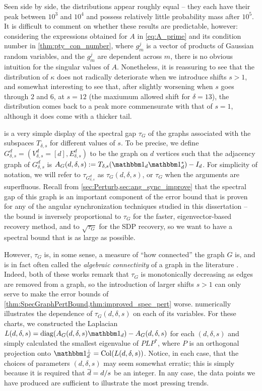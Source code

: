 Seen side by side, the distributions appear roughly equal -- they each have their peak between $10^3$ and $10^4$ and possess relatively little probability mass after $10^5$.  It is difficult to comment on whether these results are predictable, however: considering the expressions obtained for $A$ in \eqref{eq:A_prime} and its condition number in \cref{thm:pty_con_number}, where $g_m^j$ is a vector of products of Gaussian random variables, and the $g_m^j$ are dependent across $m$, there is no obvious intuition for the singular values of $A$.  Nonetheless, it is reassuring to see that the distribution of $\kappa$ does not radically deteriorate when we introduce shifts $s > 1$, and somewhat interesting to see that, after slightly worsening when $s$ goes through $2$ and $6$, at $s = 12$ (the maxiumum allowed shift for $\delta = 13$), the distribution comes back to a peak more commensurate with that of $s = 1$, although it does come with a thicker tail.

 is a very simple display of the spectral gap $\tau_G$ of the graphs associated with the subspaces $T_{\delta, s}$ for different values of $s$.  To be precise, we define $G_{\delta, s}^d = (V_{\delta, s}^d = [d], E_{\delta, s}^d)$ to be the graph on $d$ vertices such that the adjacency graph of $G_{\delta, s}^d$ is $A_G(d, \delta, s) := T_{\delta, s}(\one_d \one_d^*) - I_d$.  For simplicity of notation, we will refer to $\tau_{G_{\delta, s}^d}$ as $\tau_G(d, \delta, s)$, or $\tau_G$ when the arguments are superfluous.  Recall from \cref{sec:Perturb,sec:ang_sync_improve} that the spectral gap of this graph is an important component of the error bound that is proven for any of the angular synchronization techniques studied in this dissertation -- the bound is inversely proportional to $\tau_G$ for the faster, eigenvector-based recovery method, and to $\sqrt{\tau_G}$ for the SDP recovery, so we want to have a spectral bound that is as large as possible.

However, $\tau_G$ is, in some sense, a measure of ``how connected'' the graph $G$ is, and is in fact often called the \emph{algebraic connectivity} of a graph in the literature \cite{deabreu2006algebraicconnectivity,fiedler1973algebraic_connectivity}.  Indeed, both of these works remark that $\tau_G$ is monotonically decreasing as edges are removed from a graph, so the introduction of larger shifts $s > 1$ can only serve to make the error bounds of \cref{thm:SpecGraphPertBound,thm:improved_spec_pert} worse.   numerically illustrates the dependence of $\tau_G(d, \delta, s)$ on each of its variables.  For these charts, we constructed the Laplacian $L(d, \delta, s) = \diag(A_G(d, \delta, s) \one_d) - A_G(d, \delta, s)$ for each $(d, \delta, s)$ and simply calculated the smallest eigenvalue of $P L P^*$, where $P$ is an orthogonal projection onto $\one_d^\perp = \Col(L(d, \delta, s))$.  Notice, in each case, that the choices of parameters $(d, \delta, s)$ may seem somewhat erratic; this is simply because it is required that $\overline{d} = d / s$ be an integer.  In any case, the data points we have produced are sufficient to illustrate the most pressing trends.

